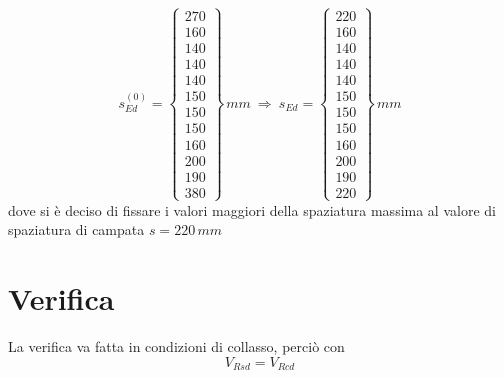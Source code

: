 \[
s_{Ed}^{(0)} = 
\begin{Bmatrix}
	270\\
	160\\
	140\\
	140\\
	140\\
	150\\
	150\\
	150\\
	160\\
	200\\
	190\\
	380
\end{Bmatrix}\,mm~\Longrightarrow~s_{Ed} = 
\begin{Bmatrix}
	220\\
	160\\
	140\\
	140\\
	140\\
	150\\
	150\\
	150\\
	160\\
	200\\
	190\\
	220
\end{Bmatrix}\,mm
\]
dove si è deciso di fissare i valori maggiori della spaziatura massima al valore di spaziatura di campata $s = 220\,mm$

\section{Verifica}
La verifica va fatta in condizioni di collasso, perciò con
\[
V_{Rsd} = V_{Rcd}
\]

